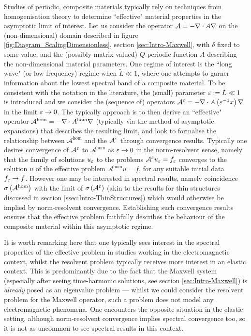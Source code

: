 Studies of periodic, composite materials typically rely on techniques from homogenisation theory to determine ``effective" material properties in the asymptotic limit of interest.
Let us consider the operator $\mathcal{A}=-\nabla\cdot A\nabla$ on the (non-dimensional) domain described in figure \ref{fig:Diagram_ScalingDimensionless}, section \ref{sec:Intro-Maxwell}, with $\delta$ fixed to some value, and the (possibly matrix-valued) $Q$-periodic function $A$ describing the non-dimensional material parameters.
One regime of interest is the ``long wave" (or low frequency) regime when $\tilde{L}\ll 1$, where one attempts to garner information about the lowest spectral band of a composite material.
To be consistent with the notation in the literature, the (small) parameter $\varepsilon:=\tilde{L}\ll 1$ is introduced and we consider the (sequence of) operators $\mathcal{A}^{\varepsilon} = -\nabla\cdot A\left( \varepsilon^{-1}x \right)\nabla$ in the limit $\varepsilon\rightarrow0$.
The typically approach is to then derive an ``effective" operator $\mathcal{A}^{\mathrm{hom}} = -\nabla\cdot A^{\mathrm{hom}}\nabla$ (typically via the method of asymptotic expansions) that describes the resulting limit, and look to formalise the relationship between $\mathcal{A}^{\mathrm{hom}}$ and the $\mathcal{A}^{\varepsilon}$ through convergence results.
Typically one desires convergence of $\mathcal{A}^{\varepsilon}$ to $\mathcal{A}^{\mathrm{hom}}$ as $\varepsilon\rightarrow0$ in the norm-resolvent sense, namely that the family of solutions $u_{\varepsilon}$ to the problems $\mathcal{A}^{\varepsilon}u_{\varepsilon}=f_{\varepsilon}$ converges to the solution $u$ of the effective problem $\mathcal{A}^{\mathrm{hom}}u = f$, for any suitable initial data $f_{\varepsilon}\rightarrow f$.
However one may be interested in spectral results, namely coincidence $\sigma\left( \mathcal{A}^{\mathrm{hom}} \right)$ with the limit of $\sigma\left( \mathcal{A}^{\varepsilon} \right)$ (akin to the results for thin structures discussed in section \ref{ssec:Intro-ThinStructures}) which would otherwise be implied by norm-resolvent convergence.
Establishing such convergence results ensures that the effective problem faithfully describes the behaviour of the composite material within this asymptotic regime.

It is worth remarking here that one typically sees interest in the spectral properties of the effective problem in studies working in the electromagnetic context, whilst the resolvent problem typically receives more interest in an elastic context.
This is predominantly due to the fact that the Maxwell system (especially after seeing time-harmonic solutions, see section \ref{sec:Intro-Maxwell}) is \emph{already} posed as an eigenvalue problem --- whilst we could consider the resolvent problem for the Maxwell operator, such a problem does not model any electromagnetic phenomena.
One encounters the opposite situation in the elastic setting, although norm-resolvent convergence implies spectral convergence too, so it is not as uncommon to see spectral results in this context.

